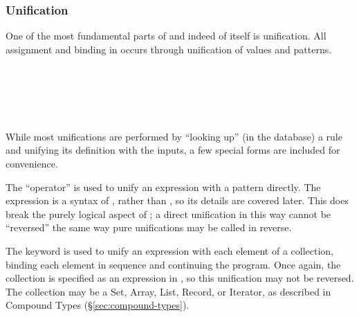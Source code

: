\subsubsection{Unification}

One of the most fundamental parts of \Law{} and indeed of \Trilogy{} itself
is unification. All assignment and binding in \Trilogy{} occurs through
unification of values and patterns.

\begin{bnf*}
     \\
     \\
     \\
     \\
\end{bnf*}

While most unifications are performed by ``looking up'' (in the database)
a rule and unifying its definition with the inputs, a few special forms are
included for convenience.

The \op{=} ``operator'' is used to unify an expression with a pattern directly. The
expression is a syntax of \Poetry{}, rather than \Law{}, so its details are covered
later. This does break the purely logical aspect of \Law{}; a direct unification in
this way cannot be ``reversed'' the same way pure \Law{} unifications may be called
in reverse.

\begin{prooftree}
\end{prooftree}

The  keyword is used to unify an expression with each element of a collection,
binding each element in sequence and continuing the program. Once again, the collection
is specified as an expression in \Poetry{}, so this unification may not be reversed.
The collection may be a Set, Array, List, Record, or Iterator, as described in
Compound Types (\S\ref{sec:compound-types}).

